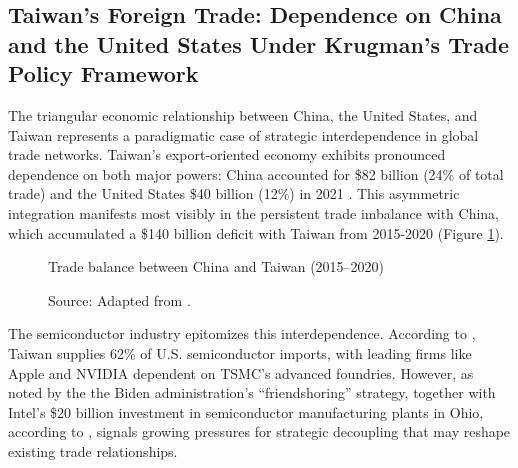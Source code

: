 \documentclass{article}
\begin{document}
\subsection{Taiwan's Foreign Trade: Dependence on China and the United States Under Krugman's Trade Policy Framework}

The triangular economic relationship between China, the United States, and Taiwan represents a paradigmatic case of strategic interdependence in global trade networks. Taiwan's export-oriented economy exhibits pronounced dependence on both major powers: China accounted for \$82 billion (24\% of total trade) and the United States \$40 billion (12\%) in 2021 \cite{ma_trade_balance_china_taiwan, bureau_of_trade_exports_imports_2022}. This asymmetric integration manifests most visibly in the persistent trade imbalance with China, which accumulated a \$140 billion deficit with Taiwan from 2015-2020 (Figure \ref{fig:tradebalance}).


\begin{figure}[h]
    \caption{Trade balance between China and Taiwan (2015–2020)}
    \centering
    \caption*{Source:  Adapted from \cite{ma_trade_balance_china_taiwan}.}
    \label{fig:tradebalance}
\end{figure}


The semiconductor industry epitomizes this interdependence. According to \cite{zandt_who_relies_on_taiwanese_trade}, Taiwan supplies 62\% of U.S. semiconductor imports, with leading firms like Apple and NVIDIA dependent on TSMC's advanced foundries. However, as noted by the \cite{us_department_state_biden_sotu} the Biden administration's “friendshoring” strategy, together with Intel’s \$20 billion investment in semiconductor manufacturing plants in Ohio, according to \cite{king_intel_chip_hub}, signals growing pressures for strategic decoupling that may reshape existing trade relationships.
\end{document}

